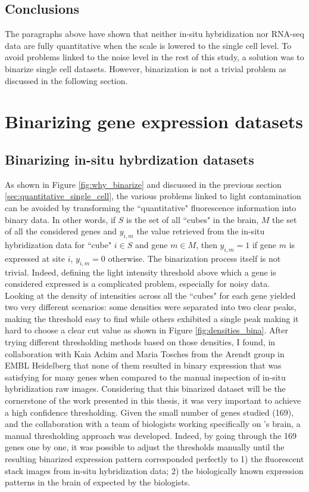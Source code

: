 	\subsection{Conclusions}
	The paragraphs above have shown that neither in-situ hybridization nor RNA-seq data are fully quantitative when the scale is lowered to the single cell level. To avoid problems linked to the noise level in the rest of this study, a solution was to binarize single cell datasets. However, binarization is not a trivial problem as discussed in the following section.



\section{Binarizing gene expression datasets}\label{sec:binarizing}
  \subsection{Binarizing in-situ hybrdization datasets}
	As shown in Figure \ref{fig:why_binarize} and discussed in the previous section \ref{sec:quantitative_single_cell}, the various problems linked to light contamination can be avoided by transforming the ``quantitative" fluorescence information into binary data. In other words, if $S$ is the set of all ``cubes" in the brain, $M$ the set of all the considered genes and $y_{i,m}$ the value retrieved from the in-situ hybridization data for ``cube" $i \in S$ and gene $m \in M$, then  $y_{i,m} = 1$ if gene $m$ is expressed at site $i$, $y_{i,m} = 0$ otherwise. The binarization process itself is not trivial. Indeed, defining the light intensity threshold above which a gene is considered expressed is a complicated problem, especially for noisy data.\\

	Looking at the density of intensities across all the ``cubes" for each gene yielded two very different scenarios: some densities were separated into two clear peaks, making the threshold easy to find while others exhibited a single peak making it hard to choose a clear cut value as shown in Figure \ref{fig:densities_bina}. After trying different thresholding methods based on those densities, I found, in collaboration with Kaia Achim and Maria Tosches from the Arendt group in EMBL Heidelberg that none of them resulted in binary expression that was satisfying for many genes when compared to the manual inspection of in-situ hybridization raw images. Considering that this binarized dataset will be the cornerstone of the work presented in this thesis, it was very important to achieve a high confidence thresholding. Given the small number of genes studied (169), and the collaboration with a team of biologists working specifically on \platyfull{}'s brain, a manual thresholding approach was developed. Indeed, by going through the 169 genes one by one, it was possible to adjust the thresholds manually until the resulting binarized expression pattern corresponded perfectly to 1) the fluorescent stack images from in-situ hybridization data; 2) the biologically known expression patterns in the brain of \platy{} expected by the biologists.\\
	
